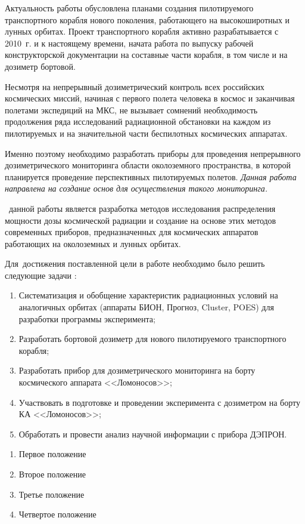 {\actuality}
 Актуальность работы обусловлена планами создания пилотируемого транспортного корабля нового поколения, работающего на высокоширотных и лунных орбитах. Проект транспортного корабля активно разрабатывается с 2010~г. и к настоящему времени, начата работа по выпуску рабочей конструкторской документации на составные части корабля, в том числе и на дозиметр бортовой.
 
 Несмотря на непрерывный дозиметрический контроль всех российских космических миссий, начиная с первого полета человека в космос и заканчивая полетами экспедиций на МКС, не вызывает сомнений необходимость продолжения ряда исследований радиационной обстановки на каждом из пилотируемых и на значительной части беспилотных космических аппаратах.  
 
 Именно поэтому необходимо разработать приборы  для проведения непрерывного дозиметрического мониторинга области околоземного пространства, в которой планируется проведение перспективных пилотируемых полетов. \textit{Данная работа направлена на создание основ для осуществления такого мониторинга.}

 \aim\ данной работы является разработка методов исследования распределения мощности дозы космической радиации и создание на основе этих методов современных приборов, предназначенных для космических аппаратов работающих на околоземных и лунных орбитах.
  

Для~достижения поставленной цели в работе необходимо было решить следующие задачи {\tasks}:
\begin{enumerate}
  \item Систематизация и обобщение характеристик радиационных условий на аналогичных орбитах (аппараты БИОН, Прогноз, Cluster, POES) для разработки программы эксперимента;
  \item Разработать бортовой дозиметр для нового пилотируемого транспортного корабля;
  \item Разработать прибор для дозиметрического мониторинга на борту космического аппарата <<Ломоносов>>;
  \item Участвовать в подготовке и проведении эксперимента с дозиметром на борту КА <<Ломоносов>>;
  \item Обработать и провести анализ научной информации с прибора ДЭПРОН.
  
\end{enumerate}

\begin{enumerate}
  \item Первое положение
  \item Второе положение
  \item Третье положение
  \item Четвертое положение
\end{enumerate}


